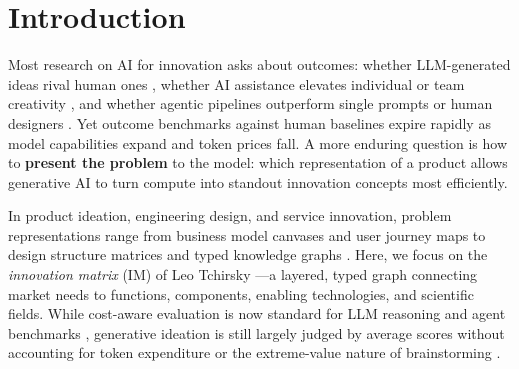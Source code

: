 \hypertarget{introduction}{%
\section{Introduction}\label{introduction}}

Most research on AI for innovation asks about outcomes: whether LLM-generated ideas rival human ones \citep{Si2024, Terwiesch2026}, whether AI assistance elevates individual or team creativity \citep{Doshi2024, Anderson2024}, and whether agentic pipelines outperform single prompts or human designers \citep{Liu2026, Massoudi2026}. Yet outcome benchmarks against human baselines expire rapidly as model capabilities expand and token prices fall. A more enduring question is how to \textbf{present the problem} to the model: which representation of a product allows generative AI to turn compute into standout innovation concepts most efficiently.

In product ideation, engineering design, and service innovation, problem representations range from business model canvases and user journey maps to design structure matrices and typed knowledge graphs \citep{ed2024, Steward1981, Gero1990}. Here, we focus on the \emph{innovation matrix} (IM) of Leo Tchirsky \citep{berengueres2014}---a layered, typed graph connecting market needs to functions, components, enabling technologies, and scientific fields. While cost-aware evaluation is now standard for LLM reasoning and agent benchmarks \citep{Chen2024d, Wang2024, Kapoor2025}, generative ideation is still largely judged by average scores without accounting for token expenditure or the extreme-value nature of brainstorming \citep{Girotra2010, Dahan2001}.

